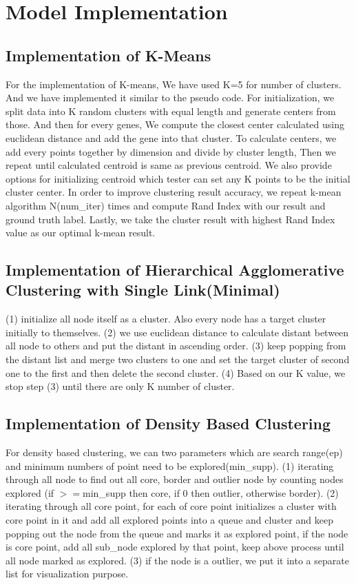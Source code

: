 \documentclass[fleqn]{llncs}
\begin{document}
\section{Model Implementation}
\subsection{Implementation of K-Means}
For the implementation of K-means, We have used K=5 for number of clusters. And we have implemented it similar to the pseudo code. For initialization, we split data into K random clusters with equal length and generate centers from those. And then for every genes, We compute the closest center calculated using euclidean distance and add the gene into that cluster. To calculate centers, we add every points together by dimension and divide by cluster length, Then we repeat until calculated centroid is same as previous centroid. We also provide options for initializing centroid which tester can set any K points to be the initial cluster center. In order to improve clustering result accuracy, we repeat k-mean algorithm N(num_iter) times and compute Rand Index with our result and ground truth label. Lastly, we take the cluster result with highest Rand Index value as our optimal k-mean result.


\subsection{Implementation of Hierarchical Agglomerative Clustering with Single Link(Minimal)}
(1) initialize all node itself as a cluster. Also every node has a target cluster initially to themselves. (2) we use euclidean distance to calculate distant between all node to others and put the distant in ascending order. (3) keep popping from the distant list and merge two clusters to one and set the target cluster of second one to the first and then delete the second cluster. (4) Based on our K value, we stop step (3) until there are only K number of cluster.

\subsection{Implementation of Density Based Clustering}
For density based clustering, we can two parameters which are search range(ep) and minimum numbers of point need to be explored(min\_supp). (1) iterating through all node to find out all core, border and outlier node by counting nodes explored (if ${>=}$min\_supp then core, if 0 then outlier, otherwise border). (2) iterating through all core point, for each of core point initializes a cluster with core point in it and add all explored points into a queue and cluster and keep popping out the node from the queue and marks it as explored point, if the node is core point, add all sub_node explored by that point, keep above process until all node marked as explored. (3) if the node is a outlier, we put it into a separate list for visualization purpose.
\end{document}
